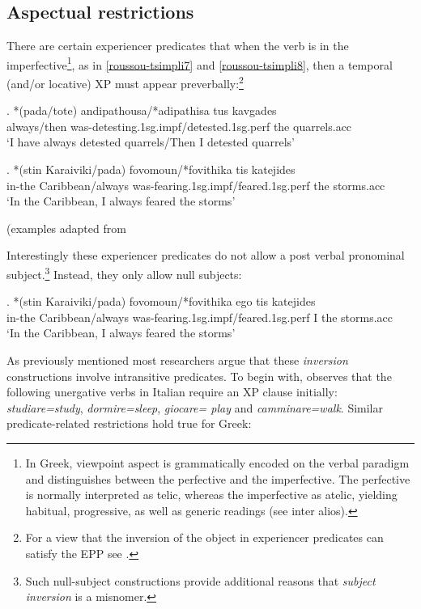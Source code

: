 \documentclass[11pt]{article}
\begin{document}
\subsection{Aspectual restrictions}

There are certain experiencer predicates that when the verb is in the imperfective\footnote{In Greek, viewpoint aspect is grammatically encoded on the verbal paradigm and distinguishes between the perfective and the imperfective. The perfective is normally interpreted as telic, whereas the imperfective as atelic, yielding habitual, progressive, as well as generic readings (see \citet{mozer:94, sioupi:02, tsimpli-papadopoulou:05, giannakidou:09} inter alios). }, as in \ref{roussou-tsimpli7} and \ref{roussou-tsimpli8}, then a temporal (and/or locative) XP must appear preverbally:\footnote{For a view that the inversion of the object in experiencer predicates can satisfy the EPP see \citet{landau:10}.}

\exg.
*(pada/tote) andipathousa/*adipathisa tus kavgades\\
always/then was-detesting.1sg.impf/detested.1sg.perf the quarrels.acc\\ \label{roussou-tsimpli7}
`I have always detested quarrels/Then I detested quarrels'

\exg.
*(stin Karaiviki/pada) fovomoun/*fovithika tis katejides\\
in-the Caribbean/always was-fearing.1sg.impf/feared.1sg.perf the storms.acc\\ \label{roussou-tsimpli8}
`In the Caribbean, I always feared the storms'

(examples adapted from \citet[pp. 348]{roussou-tsimpli:06}

Interestingly these experiencer predicates do not allow a post verbal pronominal subject.\footnote{ Such null-subject constructions provide additional reasons that \textit{subject inversion} is a misnomer.} Instead, they only allow null subjects:

\exg.
*(stin Karaiviki/pada) fovomoun/*fovithika ego tis katejides\\
in-the Caribbean/always was-fearing.1sg.impf/feared.1sg.perf  I the storms.acc\\ \label{roussou-tsimpli9}
`In the Caribbean, I always feared the storms'

As previously mentioned most researchers argue that these \textit{inversion} constructions involve intransitive predicates. To begin with, \citet{pinto:97} observes that the following unergative verbs in Italian require an XP clause initially: \textit{studiare=study}, \textit{dormire=sleep}, \textit{giocare= play} and \textit{camminare=walk}. Similar predicate-related restrictions hold true for Greek:
\end{document}
